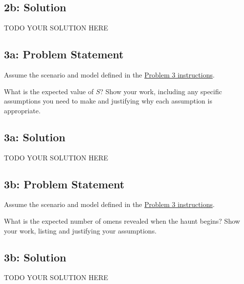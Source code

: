 \documentclass[10pt]{article}
\newcommand{\officialdirections}[1]{{\color{purple} #1}}
\begin{document}
\subsection{2b: Solution}
TODO YOUR SOLUTION HERE



\newpage
\officialdirections{
\subsection*{3a: Problem Statement}
Assume the scenario and model defined in the \href{https://www.cs.tufts.edu/cs/136/2025f/hw0.html\#problem-3}{Problem 3 instructions}. 

What is the expected value of $S$? Show your work, including any specific assumptions you need to make and justifying why each assumption is appropriate.
}

\subsection{3a: Solution}

TODO YOUR SOLUTION HERE

\newpage
\officialdirections{
\subsection*{3b: Problem Statement}
Assume the scenario and model defined in the \href{https://www.cs.tufts.edu/cs/136/2025f/hw0.html\#problem-3}{Problem 3 instructions}. 

What is the expected number of omens revealed when the haunt begins? Show your work, listing and justifying your assumptions.
}

\subsection{3b: Solution}

TODO YOUR SOLUTION HERE
\end{document}
